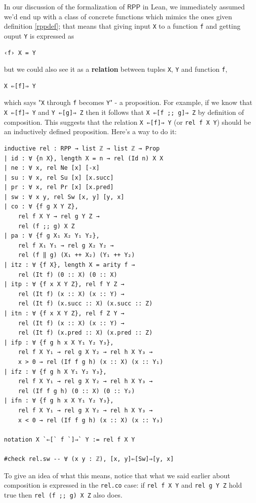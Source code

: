 \documentclass{book}
\theoremstyle{definition}
\theoremstyle{remark}
\theoremstyle{plain}
\newcommand{\RPP}{\mathsf{RPP}}
\begin{document}
In our discussion of the formalization of $\RPP$ in Lean,
we immediately assumed we'd end up with a class of concrete functions
which mimics the ones given definition \ref{rppdef};
that means that giving input \lstinline{X} to a function \lstinline{f} and getting ouput \lstinline{Y}
is expressed as
\begin{lstlisting}
‹f› X = Y
\end{lstlisting}
but we could also see it as a \textbf{relation} \cite{Pierce:SF1} between tuples \lstinline{X}, \lstinline{Y} and function \lstinline{f},
\begin{lstlisting}
X ⇐[f]⇒ Y
\end{lstlisting}
which says "\lstinline{X} through \lstinline{f} becomes \lstinline{Y}" - a proposition.
For example, if we know that \lstinline{X ⇐[f]⇒ Y} and \lstinline{Y ⇐[g]⇒ Z} then it follows that
\lstinline{X ⇐[f ;; g]⇒ Z} by definition of composition.
This suggests that the relation \lstinline{X ⇐[f]⇒ Y} (or \lstinline{rel f X Y}) should be an inductively defined proposition.
Here's a way to do it:
\begin{lstlisting}[basicstyle=\small]
inductive rel : RPP → list ℤ → list ℤ → Prop
| id : ∀ {n X}, length X = n → rel (Id n) X X
| ne : ∀ x, rel Ne [x] [-x]
| su : ∀ x, rel Su [x] [x.succ]
| pr : ∀ x, rel Pr [x] [x.pred]
| sw : ∀ x y, rel Sw [x, y] [y, x]
| co : ∀ {f g X Y Z},
    rel f X Y → rel g Y Z →
    rel (f ;; g) X Z
| pa : ∀ {f g X₁ X₂ Y₁ Y₂},
    rel f X₁ Y₁ → rel g X₂ Y₂ →
    rel (f ‖ g) (X₁ ++ X₂) (Y₁ ++ Y₂)
| itz : ∀ {f X}, length X = arity f →
    rel (It f) (0 :: X) (0 :: X)
| itp : ∀ {f x X Y Z}, rel f Y Z →
    rel (It f) (x :: X) (x :: Y) →
    rel (It f) (x.succ :: X) (x.succ :: Z)
| itn : ∀ {f x X Y Z}, rel f Z Y →
    rel (It f) (x :: X) (x :: Y) →
    rel (It f) (x.pred :: X) (x.pred :: Z)
| ifp : ∀ {f g h x X Y₁ Y₂ Y₃},
    rel f X Y₁ → rel g X Y₂ → rel h X Y₃ →
    x > 0 → rel (If f g h) (x :: X) (x :: Y₁)
| ifz : ∀ {f g h X Y₁ Y₂ Y₃},
    rel f X Y₁ → rel g X Y₂ → rel h X Y₃ →
    rel (If f g h) (0 :: X) (0 :: Y₂)
| ifn : ∀ {f g h x X Y₁ Y₂ Y₃},
    rel f X Y₁ → rel g X Y₂ → rel h X Y₃ →
    x < 0 → rel (If f g h) (x :: X) (x :: Y₃)

notation X `⇐[` f `]⇒` Y := rel f X Y

#check rel.sw -- ∀ (x y : ℤ), [x, y]⇐[Sw]⇒[y, x]
\end{lstlisting}
To give an idea of what this means, notice that what we said earlier about composition is
expressed in the \lstinline{rel.co} case: if \lstinline{rel f X Y} and \lstinline{rel g Y Z} hold true then
\lstinline{rel (f ;; g) X Z} also does.
\end{document}
